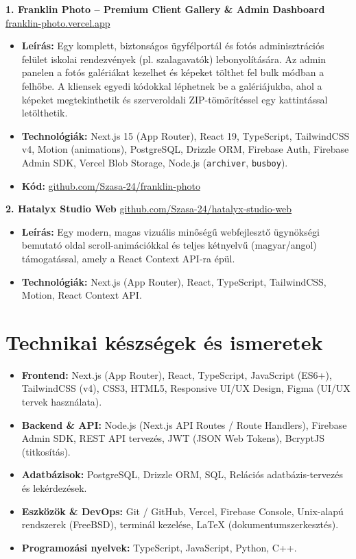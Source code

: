 \documentclass[10pt,a4paper]{article}
\begin{document}
\textbf{1. Franklin Photo -- Premium Client Gallery \& Admin Dashboard} \hfill \href{https://franklin-photo.vercel.app/}{franklin-photo.vercel.app}
\begin{itemize}
    \item \textbf{Leírás:} Egy komplett, biztonságos ügyfélportál és fotós adminisztrációs felület iskolai rendezvények (pl. szalagavatók) lebonyolítására. Az admin panelen a fotós galériákat kezelhet és képeket tölthet fel bulk módban a felhőbe. A kliensek egyedi kódokkal léphetnek be a galériájukba, ahol a képeket megtekinthetik és szerveroldali ZIP-tömörítéssel egy kattintással letölthetik.
    \item \textbf{Technológiák:} Next.js 15 (App Router), React 19, TypeScript, TailwindCSS v4, Motion (animations), PostgreSQL, Drizzle ORM, Firebase Auth, Firebase Admin SDK, Vercel Blob Storage, Node.js (\texttt{archiver}, \texttt{busboy}).
    \item \textbf{Kód:} \href{https://github.com/Szasa-24/franklin-photo}{github.com/Szasa-24/franklin-photo}
\end{itemize}

\vspace{6pt}

\textbf{2. Hatalyx Studio Web} \hfill \href{https://github.com/Szasa-24/hatalyx-studio-web}{github.com/Szasa-24/hatalyx-studio-web}
\begin{itemize}
    \item \textbf{Leírás:} Egy modern, magas vizuális minőségű webfejlesztő ügynökségi bemutató oldal scroll-animációkkal és teljes kétnyelvű (magyar/angol) támogatással, amely a React Context API-ra épül.
    \item \textbf{Technológiák:} Next.js (App Router), React, TypeScript, TailwindCSS, Motion, React Context API.
\end{itemize}

\section{Technikai készségek és ismeretek}
\begin{itemize}
    \item \textbf{Frontend:} Next.js (App Router), React, TypeScript, JavaScript (ES6+), TailwindCSS (v4), CSS3, HTML5, Responsive UI/UX Design, Figma (UI/UX tervek használata).
    \item \textbf{Backend \& API:} Node.js (Next.js API Routes / Route Handlers), Firebase Admin SDK, REST API tervezés, JWT (JSON Web Tokens), BcryptJS (titkosítás).
    \item \textbf{Adatbázisok:} PostgreSQL, Drizzle ORM, SQL, Relációs adatbázis-tervezés és lekérdezések.
    \item \textbf{Eszközök \& DevOps:} Git / GitHub, Vercel, Firebase Console, Unix-alapú rendszerek (FreeBSD), terminál kezelése, LaTeX (dokumentumszerkesztés).
    \item \textbf{Programozási nyelvek:} TypeScript, JavaScript, Python, C++.
\end{itemize}
\end{document}
